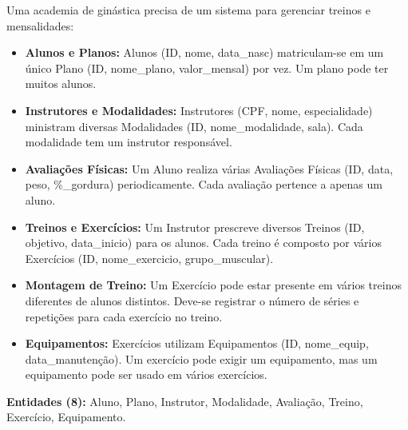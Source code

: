 \documentclass[12pt,a4paper]{article}
\newcommand{\resposta}[1]{
\noindent
\framebox[\textwidth]{
\begin{minipage}{0.98\textwidth}
\vspace{#1}
\end{minipage}
}
}
\begin{document}
Uma academia de ginástica precisa de um sistema para gerenciar treinos e mensalidades:
\begin{itemize}
    \item \textbf{Alunos e Planos:} Alunos (ID, nome, data\_nasc) matriculam-se em um único Plano (ID, nome\_plano, valor\_mensal) por vez. Um plano pode ter muitos alunos.
    \item \textbf{Instrutores e Modalidades:} Instrutores (CPF, nome, especialidade) ministram diversas Modalidades (ID, nome\_modalidade, sala). Cada modalidade tem um instrutor responsável.
    \item \textbf{Avaliações Físicas:} Um Aluno realiza várias Avaliações Físicas (ID, data, peso, \%\_gordura) periodicamente. Cada avaliação pertence a apenas um aluno.
    \item \textbf{Treinos e Exercícios:} Um Instrutor prescreve diversos Treinos (ID, objetivo, data\_inicio) para os alunos. Cada treino é composto por vários Exercícios (ID, nome\_exercicio, grupo\_muscular).
    \item \textbf{Montagem de Treino:} Um Exercício pode estar presente em vários treinos diferentes de alunos distintos. Deve-se registrar o número de séries e repetições para cada exercício no treino.
    \item \textbf{Equipamentos:} Exercícios utilizam Equipamentos (ID, nome\_equip, data\_manutenção). Um exercício pode exigir um equipamento, mas um equipamento pode ser usado em vários exercícios.
\end{itemize}

\textbf{Entidades (8):} Aluno, Plano, Instrutor, Modalidade, Avaliação, Treino, Exercício, Equipamento.

\resposta{12cm}
\end{document}
